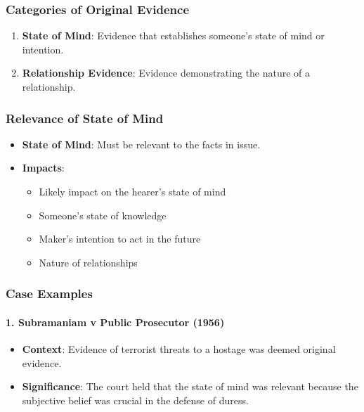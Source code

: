 \subsubsection{Categories of Original
Evidence}\label{categories-of-original-evidence}

\begin{enumerate}
\def\labelenumi{\arabic{enumi}.}
\tightlist
\item
  \textbf{State of Mind}: Evidence that establishes someone's state of
  mind or intention.
\item
  \textbf{Relationship Evidence}: Evidence demonstrating the nature of a
  relationship.
\end{enumerate}

\subsubsection{Relevance of State of
Mind}\label{relevance-of-state-of-mind}

\begin{itemize}
\tightlist
\item
  \textbf{State of Mind}: Must be relevant to the facts in issue.
\item
  \textbf{Impacts}:

  \begin{itemize}
  \tightlist
  \item
    Likely impact on the hearer's state of mind
  \item
    Someone's state of knowledge
  \item
    Maker's intention to act in the future
  \item
    Nature of relationships
  \end{itemize}
\end{itemize}

\subsubsection{Case Examples}\label{case-examples-1}

\paragraph{1. Subramaniam v Public Prosecutor
(1956)}\label{subramaniam-v-public-prosecutor-1956}

\begin{itemize}
\tightlist
\item
  \textbf{Context}: Evidence of terrorist threats to a hostage was
  deemed original evidence.
\item
  \textbf{Significance}: The court held that the state of mind was
  relevant because the subjective belief was crucial in the defense of
  duress.
\end{itemize}

